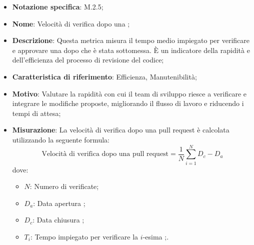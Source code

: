 \begin{itemize}
    \item \textbf{Notazione specifica}: M.2.5;
    \item \textbf{Nome}: Velocità di verifica dopo una ;
    \item \textbf{Descrizione}: Questa metrica misura il tempo medio impiegato per verificare e approvare una  dopo che è stata sottomessa. È un indicatore della rapidità e dell'efficienza del processo di revisione del codice;
    \item \textbf{Caratteristica di riferimento}: Efficienza, Manutenibilità;
    \item \textbf{Motivo}: Valutare la rapidità con cui il team di sviluppo riesce a verificare e integrare le modifiche proposte, migliorando il flusso di lavoro e riducendo i tempi di attesa;
    \item \textbf{Misurazione}: La velocità di verifica dopo una pull request è calcolata utilizzando la seguente formula:
    \[
        \text{Velocità di verifica dopo una pull request} =\frac{1}{N} \sum_{i=1}^{N} D_{c} - D_{a} 
    \]
    dove:
    \begin{itemize}
        \item $N$: Numero di  verificate;
        \item $D_{a}$: Data apertura ;
        \item $D_{c}$: Data chiusura ;
        \item $T_{i}$: Tempo impiegato per verificare la \(i\)-esima ;.
    \end{itemize}
\end{itemize}

